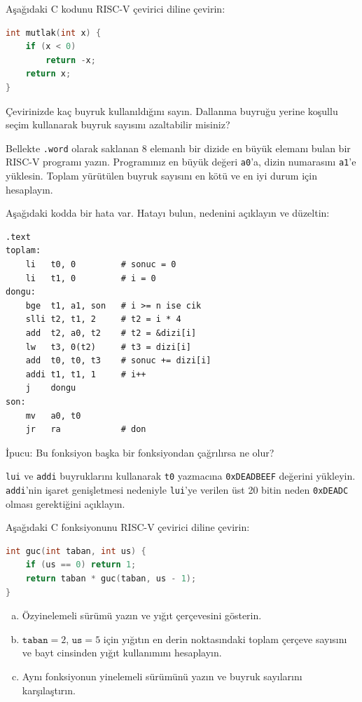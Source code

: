 \begin{alistirma}[\orta]
Aşağıdaki C kodunu RISC-V çevirici diline çevirin:
\begin{lstlisting}[language=C, style=alistirma-kod]
int mutlak(int x) {
    if (x < 0)
        return -x;
    return x;
}
\end{lstlisting}
Çevirinizde kaç buyruk kullanıldığını sayın. Dallanma buyruğu yerine koşullu seçim kullanarak buyruk sayısını azaltabilir misiniz?
\end{alistirma}

\begin{alistirma}[\orta]
Bellekte \texttt{.word} olarak saklanan 8 elemanlı bir dizide en büyük elemanı bulan bir RISC-V programı yazın. Programınız en büyük değeri \texttt{a0}'a, dizin numarasını \texttt{a1}'e yüklesin. Toplam yürütülen buyruk sayısını en kötü ve en iyi durum için hesaplayın.
\end{alistirma}

\begin{alistirma}[\orta]
Aşağıdaki kodda bir hata var. Hatayı bulun, nedenini açıklayın ve düzeltin:
\begin{lstlisting}[style=riscv]
    .text
toplam:
    li   t0, 0         # sonuc = 0
    li   t1, 0         # i = 0
dongu:
    bge  t1, a1, son   # i >= n ise cik
    slli t2, t1, 2     # t2 = i * 4
    add  t2, a0, t2    # t2 = &dizi[i]
    lw   t3, 0(t2)     # t3 = dizi[i]
    add  t0, t0, t3    # sonuc += dizi[i]
    addi t1, t1, 1     # i++
    j    dongu
son:
    mv   a0, t0
    jr   ra            # don
\end{lstlisting}
İpucu: Bu fonksiyon başka bir fonksiyondan çağrılırsa ne olur?
\end{alistirma}

\begin{alistirma}[\orta]
\texttt{lui} ve \texttt{addi} buyruklarını kullanarak \texttt{t0} yazmacına \texttt{0xDEADBEEF} değerini yükleyin. \texttt{addi}'nin işaret genişletmesi nedeniyle \texttt{lui}'ye verilen üst 20 bitin neden \texttt{0xDEADC} olması gerektiğini açıklayın.
\end{alistirma}

\begin{alistirma}[\zor]
Aşağıdaki C fonksiyonunu RISC-V çevirici diline çevirin:
\begin{lstlisting}[language=C, style=alistirma-kod]
int guc(int taban, int us) {
    if (us == 0) return 1;
    return taban * guc(taban, us - 1);
}
\end{lstlisting}
\begin{enumerate}[(a)]
\item Özyinelemeli sürümü yazın ve yığıt çerçevesini gösterin.
\item $\texttt{taban} = 2$, $\texttt{us} = 5$ için yığıtın en derin noktasındaki toplam çerçeve sayısını ve bayt cinsinden yığıt kullanımını hesaplayın.
\item Aynı fonksiyonun yinelemeli sürümünü yazın ve buyruk sayılarını karşılaştırın.
\end{enumerate}
\end{alistirma}

